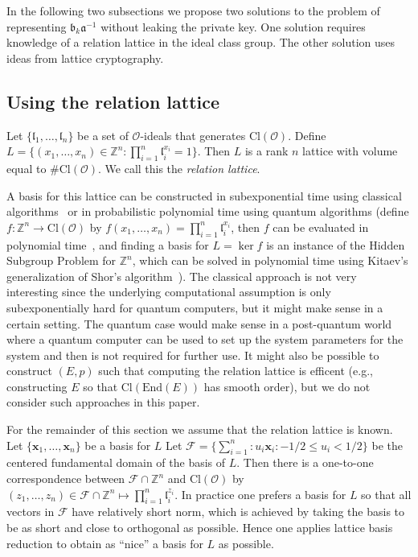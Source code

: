 \documentclass{llncs}
\newcommand{\FF}{\mathcal{F}}
\newcommand{\OO}{\mathcal{O}}
\newcommand{\Z}{\mathbb{Z}}
\newcommand{\End}{\text{End}}
\newcommand{\Cl}{\text{Cl}}
\renewcommand{\a}{\mathfrak{a}}
\renewcommand{\b}{\mathfrak{b}}
\renewcommand{\l}{\mathfrak{l}}
\newcommand{\x}{\textbf{x}}
\begin{document}
In the following two subsections we propose two solutions to the problem of representing $\b_k \a^{-1}$ without leaking the private key. One solution requires knowledge of a relation lattice in the ideal class group. The other solution uses ideas from lattice cryptography.

\subsection{Using the relation lattice}\label{sec:sig-relation-lattice}

Let $\{ \l_1, \dots, \l_n \}$ be a set of $\OO$-ideals that generates $\Cl( \OO )$.
Define $L = \{ (x_1, \dots, x_n ) \in \Z^n : \prod_{i=1}^n \l_i^{x_i} = 1 \}$.
Then $L$ is a rank $n$ lattice with volume equal to $\#\Cl(\OO)$.
We call this the \emph{relation lattice}.

A basis for this lattice can be constructed in subexponential time using classical algorithms~\cite{hafner1989rigorous,biasse_fieker_jacobson_2016} or in probabilistic polynomial time using quantum algorithms (define $f:\Z^n\to\Cl(\OO)$ by $f(x_1,\dots,x_n)=\prod_{i=1}^n\l_i^{x_i}$, then $f$ can be evaluated in polynomial time~\cite{shanks1989gauss,Cohen1993}, and finding a basis for $L=\ker f$ is an instance of the Hidden Subgroup Problem for $\Z^n$, which can be solved in polynomial time using Kitaev's generalization of Shor's algorithm~\cite{kitaev1995hsp}).
The classical approach is not very interesting since the underlying computational assumption is only subexponentially hard for quantum computers, but it might make sense in a certain setting.
The quantum case would make sense in a post-quantum world where a quantum computer can be used to set up the system parameters for the system and then is not required for further use.
It might also be possible to construct $(E, p )$ such that computing the relation lattice is efficent (e.g., constructing $E$ so that $\Cl( \End(E))$ has smooth order), but we do not consider such approaches in this paper.

For the remainder of this section we assume that the relation lattice is known.
Let $\{ \x_1, \dots, \x_n \}$ be a basis for $L$
Let $\FF = \{ \sum_{i=1}^n : u_i \x_i : -1/2 \le u_i < 1/2 \}$ be the centered fundamental domain of the basis of $L$.
Then there is a one-to-one correspondence between $\FF \cap \Z^n$ and $\Cl(\OO)$ by
$(z_1, \dots, z_n ) \in \FF \cap \Z^n  \mapsto \prod_{i=1}^n \l_i^{z_i}$.
In practice one prefers a basis for $L$ so that all vectors in $\FF$ have relatively short norm, which is achieved by taking the basis to be as short and close to orthogonal as possible. Hence one applies lattice basis reduction to obtain as ``nice'' a basis for $L$ as possible.
\end{document}

